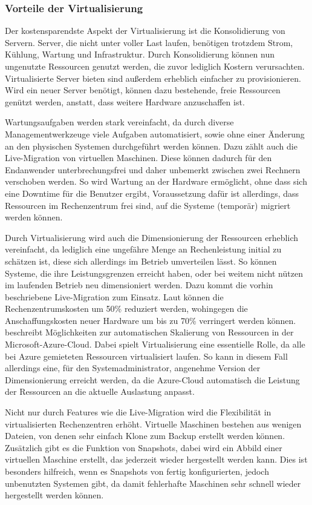 \subsubsection{Vorteile der Virtualisierung \autocite[198]{Baun2009}}
Der kostensparendste Aspekt der Virtualisierung ist die Konsolidierung von Servern.
Server, die nicht unter voller Last laufen, benötigen trotzdem Strom, Kühlung, Wartung und Infrastruktur.
Durch Konsolidierung können nun ungenutzte Ressourcen genutzt werden, die zuvor lediglich Kostern verursachten.
Virtualisierte Server bieten sind außerdem erheblich einfacher zu provisionieren.
Wird ein neuer Server benötigt, können dazu bestehende, freie Ressourcen genützt werden, anstatt, dass weitere Hardware anzuschaffen ist.

Wartungsaufgaben werden stark vereinfacht, da durch diverse Managementwerkzeuge viele Aufgaben automatisiert, sowie ohne einer Änderung an den physischen Systemen durchgeführt werden können.
Dazu zählt auch die Live-Migration von virtuellen Maschinen.
Diese können dadurch für den Endanwender unterbrechungsfrei und daher unbemerkt zwischen zwei Rechnern verschoben werden.
So wird Wartung an der Hardware ermöglicht, ohne dass sich eine Downtime für die Benutzer ergibt, Voraussetzung dafür ist allerdings, dass Ressourcen im Rechenzentrum frei sind, auf die Systeme (temporär) migriert werden können.

Durch Virtualisierung wird auch die Dimensionierung der Ressourcen erheblich vereinfacht, da lediglich eine ungefähre Menge an Rechenleistung initial zu schätzen ist, diese sich allerdings im Betrieb umverteilen lässt.
So können Systeme, die ihre Leistungsgrenzen erreicht haben, oder bei weitem nicht nützen im laufenden Betrieb neu dimensioniert werden.
Dazu kommt die vorhin beschriebene Live-Migration zum Einsatz.
Laut \autocite{Hantelmann2008} können die Rechenzentrumskosten um 50\% reduziert werden, wohingegen die Anschaffungskosten neuer Hardware um bis zu 70\% verringert werden können.
\autocite{Azure-Scaling:online} beschreibt Möglichkeiten zur automatischen Skalierung von Ressourcen in der Microsoft-Azure-Cloud.
Dabei spielt Virtualisierung eine essentielle Rolle, da alle bei Azure gemieteten Ressourcen virtualisiert laufen.
So kann in diesem Fall allerdings eine, für den Systemadministrator, angenehme Version der Dimensionierung erreicht werden, da die Azure-Cloud automatisch die Leistung der Ressourcen an die aktuelle Auslastung anpasst.

Nicht nur durch Features wie die Live-Migration wird die Flexibilität in virtualisierten Rechenzentren erhöht.
Virtuelle Maschinen bestehen aus wenigen Dateien, von denen sehr einfach Klone zum Backup erstellt werden können.
Zusätzlich gibt es die Funktion von Snapshots, dabei wird ein Abbild einer virtuellen Maschine erstellt, das jederzeit wieder hergestellt werden kann.
Dies ist besonders hilfreich, wenn es Snapshots von fertig konfigurierten, jedoch unbenutzten Systemen gibt, da damit fehlerhafte Maschinen sehr schnell wieder hergestellt werden können.

